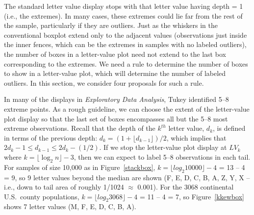 \documentclass[oneside]{article}
\begin{document}




The standard letter value display stops with that letter value having depth = 1 (i.e., the extremes). In many cases, these extremes could lie far from the rest of the sample, particularly if they are outliers. Just as the whiskers in the conventional boxplot extend only to the adjacent values (observations just inside the inner fences, which can be the extremes in samples with no labeled outliers), the number of boxes in a letter-value plot need not extend to the last box corresponding to the extremes. We need a rule to determine the number of boxes to show in a letter-value plot, which will determine the number of labeled outliers. In this section, we consider four proposals for such a rule.

In many of the displays in \textit{Exploratory Data Analysis}, Tukey identified 5--8 extreme points. As a rough guideline, we can choose the extent of the letter-value plot display so that the last set of boxes encompasses all but the 5--8 most extreme observations. Recall that the depth of the $k^{th}$ letter value, $d_k$, is defined in terms of the previous depth: $d_k = (1 + \lfloor d_{k-1} \rfloor)/2$, which implies that $2 d_{k} -1 \leq d_{k-1} \leq 2 d_k - (1/2)$. If we stop the letter-value plot display at $LV_k$ where $k = \lfloor \log_2 n \rfloor - 3$, then we can expect to label 5--8 observations in each tail. For samples of size 10,000 as in Figure~\ref{stackbox}, $k = \lfloor log_2 10000 \rfloor - 4$ = 13 -- 4 = 9, so 9 letter values beyond the median are shown (F, E, D, C, B, A, Z, Y, X -- i.e., down to tail area of roughly 1/1024 $\approx$ 0.001). For the 3068 continental U.S.\ county populations, $k = \lfloor log_2 3068 \rfloor - 4$ = 11 -- 4 = 7, so Figure~\ref{kkewbox} shows 7 letter values (M, F, E, D, C, B, A).
\end{document}
